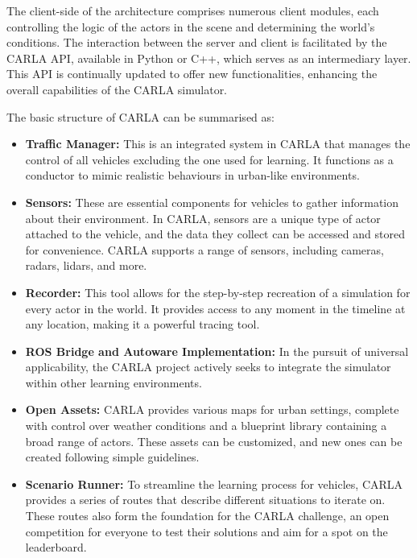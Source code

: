The client-side of the architecture comprises numerous client modules, each controlling the logic of the actors in the scene and determining the world's conditions. The interaction between the server and client is facilitated by the CARLA API, available in Python or C++, which serves as an intermediary layer. This API is continually updated to offer new functionalities, enhancing the overall capabilities of the CARLA simulator.

The basic structure of CARLA can be summarised as:

\begin{itemize}
\item \textbf{Traffic Manager:} This is an integrated system in CARLA that manages the control of all vehicles excluding the one used for learning. It functions as a conductor to mimic realistic behaviours in urban-like environments.
\item \textbf{Sensors:} These are essential components for vehicles to gather information about their environment. In CARLA, sensors are a unique type of actor attached to the vehicle, and the data they collect can be accessed and stored for convenience. CARLA supports a range of sensors, including cameras, radars, lidars, and more.
\item \textbf{Recorder:} This tool allows for the step-by-step recreation of a simulation for every actor in the world. It provides access to any moment in the timeline at any location, making it a powerful tracing tool.
\item \textbf{ROS Bridge and Autoware Implementation:} In the pursuit of universal applicability, the CARLA project actively seeks to integrate the simulator within other learning environments.
\item \textbf{Open Assets:} CARLA provides various maps for urban settings, complete with control over weather conditions and a blueprint library containing a broad range of actors. These assets can be customized, and new ones can be created following simple guidelines.
\item \textbf{Scenario Runner:} To streamline the learning process for vehicles, CARLA provides a series of routes that describe different situations to iterate on. These routes also form the foundation for the CARLA challenge, an open competition for everyone to test their solutions and aim for a spot on the leaderboard.
\end{itemize}